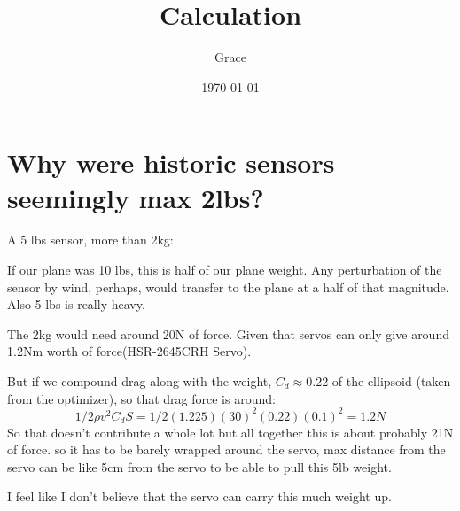 \documentclass{article}
\title{Calculation}
\author{Grace}
\date{\today}
\begin{document}
\maketitle

\section{Why were historic sensors seemingly max 2lbs?}

A 5 lbs sensor, more than 2kg:

If our plane was 10 lbs, this is half of our plane weight. Any perturbation of the sensor by wind, perhaps, would transfer to the plane at a half of that magnitude. Also 5 lbs is really heavy.

The 2kg would need around 20N of force. Given that servos can only give around 1.2Nm worth of force(HSR-2645CRH Servo).

But if we compound drag along with the weight, $C_d \approx 0.22$ of the ellipsoid (taken from the optimizer), so that drag force is around:
\[
	1/2 \rho v^2 C_d S = 1/2 (1.225) (30)^2 (0.22) (0.1)^2 = 1.2N
\] 
So that doesn't contribute a whole lot but all together this is about probably 21N of force. so it has to be barely wrapped around the servo, max distance from the servo can be like 5cm from the servo to be able to pull this 5lb weight.

I feel like I don't believe that the servo can carry this much weight up.
\end{document}
